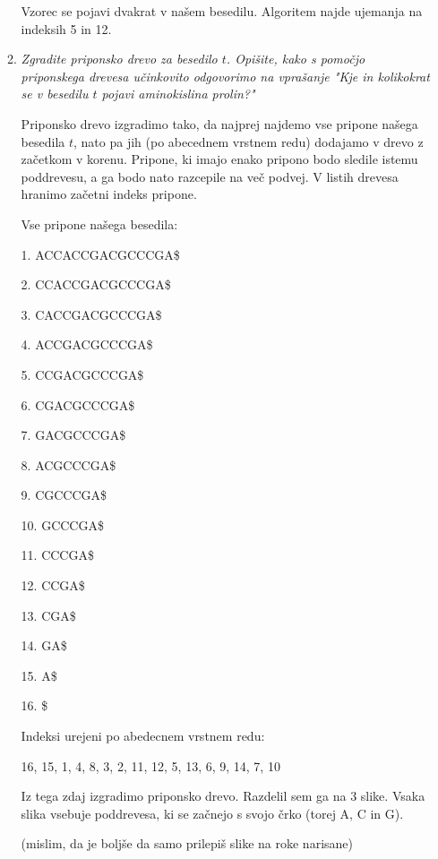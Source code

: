 \documentclass{article}
\begin{document}
\begin{enumerate}
\begin{enumerate}
				Vzorec se pojavi dvakrat v našem besedilu. Algoritem najde ujemanja na indeksih
				5 in 12.

			\item \textit{Zgradite priponsko drevo za besedilo $t$. Opišite, kako s pomočjo
					priponskega drevesa učinkovito odgovorimo na vprašanje "Kje in kolikokrat se v
				besedilu $t$ pojavi aminokislina prolin?"}

				Priponsko drevo izgradimo tako, da najprej najdemo vse pripone našega besedila $t$,
				nato pa jih (po abecednem vrstnem redu) dodajamo v drevo z začetkom v korenu.
				Pripone, ki imajo enako pripono bodo sledile istemu poddrevesu, a ga bodo nato
				razcepile na več podvej. V listih drevesa hranimo začetni indeks pripone.

				Vse pripone našega besedila:

				1. ACCACCGACGCCCGA\$

				2. CCACCGACGCCCGA\$

				3. CACCGACGCCCGA\$

				4. ACCGACGCCCGA\$

				5. CCGACGCCCGA\$

				6. CGACGCCCGA\$

				7. GACGCCCGA\$

				8. ACGCCCGA\$

				9. CGCCCGA\$

				10. GCCCGA\$

				11. CCCGA\$

				12. CCGA\$

				13. CGA\$

				14. GA\$

				15. A\$

				16. \$

				Indeksi urejeni po abedecnem vrstnem redu:

				\begin{center}
					16, 15, 1, 4, 8, 3, 2, 11, 12, 5, 13, 6, 9, 14, 7, 10
				\end{center}

				Iz tega zdaj izgradimo priponsko drevo. Razdelil sem ga na 3 slike. Vsaka slika
				vsebuje poddrevesa, ki se začnejo s svojo črko (torej A, C in G).

				(mislim, da je boljše da samo prilepiš slike na roke narisane)


\end{enumerate}
\end{enumerate}
\end{document}
